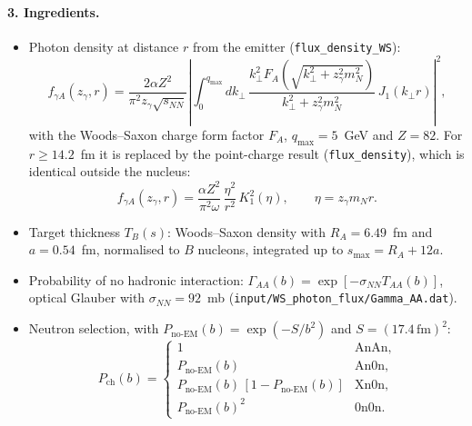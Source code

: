 \documentclass[11pt]{article}
\begin{document}
\paragraph{3. Ingredients.}
\begin{itemize}
\item Photon density at distance $r$ from the emitter (\texttt{flux\_density\_WS}):
  \begin{equation}
    f_{\gamma A}(z_\gamma,r)=\frac{2\alpha Z^2}{\pi^2 z_\gamma\sqrt{s_{NN}}}
    \left|\int_0^{q_{\max}}dk_\perp\,
    \frac{k_\perp^2F_A\!\left(\sqrt{k_\perp^2+z_\gamma^2m_N^2}\right)}{k_\perp^2+z_\gamma^2m_N^2}\,
    J_1(k_\perp r)\right|^2,
  \end{equation}
  with the Woods--Saxon charge form factor $F_A$, $q_{\max}=5$~GeV and $Z=82$. For $r\geq 14.2$~fm
  it is replaced by the point-charge result (\texttt{flux\_density}), which is identical outside
  the nucleus:
  \begin{equation}
    f_{\gamma A}(z_\gamma,r)=\frac{\alpha Z^2}{\pi^2\omega}\,\frac{\eta^2}{r^2}\,K_1^2(\eta),
    \qquad \eta=z_\gamma m_N r .
  \end{equation}
\item Target thickness $T_B(s)$: Woods--Saxon density with $R_A=6.49$~fm and $a=0.54$~fm,
  normalised to $B$ nucleons, integrated up to $s_{\max}=R_A+12a$.
\item Probability of no hadronic interaction: $\Gamma_{AA}(b)=\exp[-\sigma_{NN}T_{AA}(b)]$, optical
  Glauber with $\sigma_{NN}=92$~mb (\texttt{input/WS\_photon\_flux/Gamma\_AA.dat}).
\item Neutron selection, with $P_{\text{no-EM}}(b)=\exp(-S/b^2)$ and $S=(17.4\,\text{fm})^2$:
  \begin{equation}
    P_{\text{ch}}(b)=
    \begin{cases}
      1 & \text{AnAn},\\
      P_{\text{no-EM}}(b) & \text{An0n},\\
      P_{\text{no-EM}}(b)\,[1-P_{\text{no-EM}}(b)] & \text{Xn0n},\\
      P_{\text{no-EM}}(b)^2 & \text{0n0n}.
    \end{cases}
  \end{equation}
\end{itemize}
\end{document}
